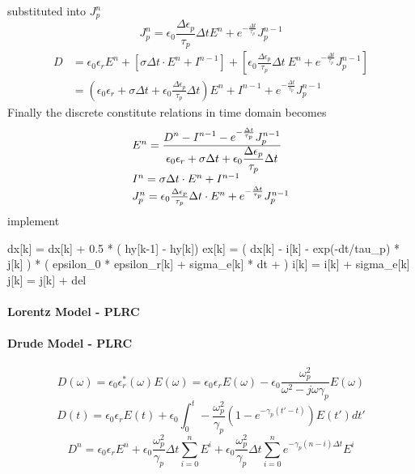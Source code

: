 substituted into $J_p^n$
\begin{equation}
  J_p^n = \epsilon_0\frac{\Delta\epsilon_p}{\tau_p}\Delta t E^n + e^{-\frac{\Delta t}{\tau_p}} J_p^{n-1}
\end{equation}
\begin{equation}
  \begin{split}
    D & = \epsilon_0 \epsilon_r E^n + \left[\sigma \Delta t\cdot E^n + I^{n-1}\right] + \left[\epsilon_0 \frac{\Delta \epsilon_p}{\tau_p}\Delta t\ E^n + e^{-\frac{\Delta t}{\tau_p}} J_p^{n-1}\right]\\
    & = \left(\epsilon_0 \epsilon_r + \sigma \Delta t + \epsilon_0 \frac{\Delta \epsilon_p}{\tau_p} \Delta t\right)E^n + I^{n-1} + e^{-\frac{\Delta t}{\tau_p}} J_p^{n-1}
  \end{split}
\end{equation}
Finally the discrete constitute relations in time domain becomes
\begin{gather}
  \begin{array}{@{}l@{}}
    E^n =  \frac{\displaystyle D^n - I^{n-1} - e^{-\frac{\Delta t}{\tau_p}}J_p^{n-1} }{\displaystyle\epsilon_0 \epsilon_r + \sigma \Delta t + \epsilon_0 \frac{\Delta \epsilon_p}{\tau_p} \Delta t}\\    
    I^n = \sigma\Delta t\cdot E^n + I^{n-1}\\
    J_p^n = \epsilon_0\frac{\Delta\epsilon_p}{\tau_p}\Delta t\cdot E^n + e^{-\frac{\Delta t}{\tau_p}} J_p^{n-1}
  \end{array}
\end{gather}
implement
\begin{code}
  dx[k] = dx[k] + 0.5 * ( hy[k-1] - hy[k])
  ex[k] = ( dx[k] - i[k] - exp(-dt/tau_p) * j[k] ) 
  * ( epsilon_0 * epsilon_r[k] + sigma_e[k] * dt +  )
  i[k] = i[k] + sigma_e[k] 
  j[k] = j[k] + del
\end{code}






\paragraph{{\msjh Lorentz Model - PLRC}}


\paragraph{{\msjh Drude Model - PLRC}}
\begin{equation}
  D(\omega) = \epsilon_0\epsilon_r^*(\omega)E(\omega) = \epsilon_0\epsilon_rE(\omega) - \epsilon_0\frac{\omega_p^2}{\omega^2-j\omega\gamma_p}E(\omega)
\end{equation}
\begin{equation}
  D(t) = \epsilon_0\epsilon_rE(t) + \epsilon_0\int_0^t -\frac{\omega_p^2}{\gamma_p}(1 - e^{-\gamma_p(t'-t)})E(t')dt'
\end{equation}
\begin{equation}
  D^n = \epsilon_0\epsilon_rE^n + \epsilon_0\frac{\omega_p^2}{\gamma_p}\Delta t\sum_{i=0}^{n}E^i + \epsilon_0\frac{\omega_p^2}{\gamma_p}\Delta t \sum_{i=0}^{n}e^{-\gamma_p(n-i)\Delta t} E^i
\end{equation}



